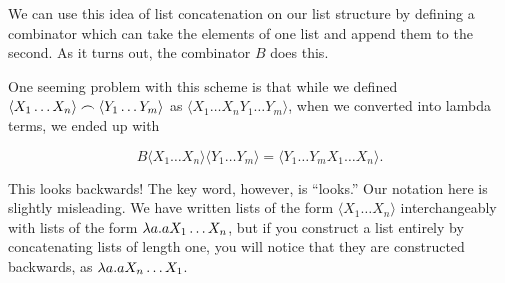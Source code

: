 We can use this idea of list concatenation on our list structure by defining a combinator which can take the elements of one list and append them to the second. As it turns out, the combinator $B$ does this.\\

One seeming problem with this scheme is that while we defined $\langle X_1\ldots X_n \rangle \frown \langle Y_1\ldots Y_m \rangle$ as $\langle X_1 \ldots X_n Y_1 \ldots Y_m \rangle$, when we converted into lambda terms, we ended up with

\begin{equation*}
  B\langle X_1 \ldots X_n \rangle\langle Y_1 \ldots Y_m \rangle = \langle Y_1 \ldots Y_m X_1 \ldots X_n\rangle.
\end{equation*}

This looks backwards! The key word, however, is ``looks.'' Our notation here is slightly misleading. We have written lists of the form $\langle X_1 \ldots X_n \rangle$ interchangeably with lists of the form $\lambda a.aX_1\ldots X_n$, but if you construct a list entirely by concatenating lists of length one, you will notice that they are constructed backwards, as $\lambda a.aX_n \ldots X_1$.\\


